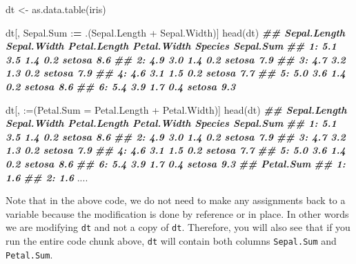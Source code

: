 \documentclass[
]{book}
\newenvironment{Shaded}{\begin{snugshade}}{\end{snugshade}}
\newcommand{\AttributeTok}[1]{\textcolor[rgb]{0.77,0.63,0.00}{#1}}
\newcommand{\DocumentationTok}[1]{\textcolor[rgb]{0.56,0.35,0.01}{\textbf{\textit{#1}}}}
\newcommand{\ErrorTok}[1]{\textcolor[rgb]{0.64,0.00,0.00}{\textbf{#1}}}
\newcommand{\FunctionTok}[1]{\textcolor[rgb]{0.00,0.00,0.00}{#1}}
\newcommand{\NormalTok}[1]{#1}
\newcommand{\OtherTok}[1]{\textcolor[rgb]{0.56,0.35,0.01}{#1}}
\newcommand{\SpecialCharTok}[1]{\textcolor[rgb]{0.00,0.00,0.00}{#1}}
\newcommand{\StringTok}[1]{\textcolor[rgb]{0.31,0.60,0.02}{#1}}
\begin{document}
\begin{Shaded}
\begin{Highlighting}[]
\NormalTok{dt }\OtherTok{\textless{}{-}} \FunctionTok{as.data.table}\NormalTok{(iris)}

\NormalTok{dt[, Sepal.Sum }\SpecialCharTok{:}\ErrorTok{=}\NormalTok{ .(Sepal.Length }\SpecialCharTok{+}\NormalTok{ Sepal.Width)]}
\FunctionTok{head}\NormalTok{(dt)}
\DocumentationTok{\#\#    Sepal.Length Sepal.Width Petal.Length Petal.Width Species Sepal.Sum}
\DocumentationTok{\#\# 1:          5.1         3.5          1.4         0.2  setosa       8.6}
\DocumentationTok{\#\# 2:          4.9         3.0          1.4         0.2  setosa       7.9}
\DocumentationTok{\#\# 3:          4.7         3.2          1.3         0.2  setosa       7.9}
\DocumentationTok{\#\# 4:          4.6         3.1          1.5         0.2  setosa       7.7}
\DocumentationTok{\#\# 5:          5.0         3.6          1.4         0.2  setosa       8.6}
\DocumentationTok{\#\# 6:          5.4         3.9          1.7         0.4  setosa       9.3}

\NormalTok{dt[, }\StringTok{\textasciigrave{}}\AttributeTok{:=}\StringTok{\textasciigrave{}}\NormalTok{(}\AttributeTok{Petal.Sum =}\NormalTok{ Petal.Length }\SpecialCharTok{+}\NormalTok{ Petal.Width)]}
\FunctionTok{head}\NormalTok{(dt)}
\DocumentationTok{\#\#    Sepal.Length Sepal.Width Petal.Length Petal.Width Species Sepal.Sum}
\DocumentationTok{\#\# 1:          5.1         3.5          1.4         0.2  setosa       8.6}
\DocumentationTok{\#\# 2:          4.9         3.0          1.4         0.2  setosa       7.9}
\DocumentationTok{\#\# 3:          4.7         3.2          1.3         0.2  setosa       7.9}
\DocumentationTok{\#\# 4:          4.6         3.1          1.5         0.2  setosa       7.7}
\DocumentationTok{\#\# 5:          5.0         3.6          1.4         0.2  setosa       8.6}
\DocumentationTok{\#\# 6:          5.4         3.9          1.7         0.4  setosa       9.3}
\DocumentationTok{\#\#    Petal.Sum}
\DocumentationTok{\#\# 1:       1.6}
\DocumentationTok{\#\# 2:       1.6}
\NormalTok{....}
\end{Highlighting}
\end{Shaded}

Note that in the above code, we do not need to make any assignments back to a variable because the modification is done by reference or in place. In other words we are modifying \texttt{dt} and not a copy of \texttt{dt}. Therefore, you will also see that if you run the entire code chunk above, \texttt{dt} will contain both columns \texttt{Sepal.Sum} and \texttt{Petal.Sum}.
\end{document}
